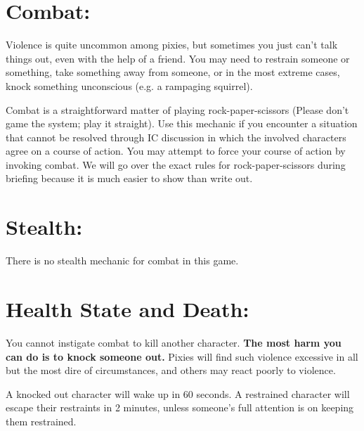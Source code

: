 \documentclass[sheet]{PP}
\begin{document}
\section*{Combat:}
Violence is quite uncommon among pixies, but sometimes you just can't talk things out, even with the help of a friend. You may need to restrain someone or something, take something away from someone, or in the most extreme cases, knock something unconscious (e.g. a rampaging squirrel).

Combat is a straightforward matter of playing rock-paper-scissors (Please don't game the system; play it straight). Use this mechanic if you encounter a situation that cannot be resolved through IC discussion in which the involved characters agree on a course of action. You may attempt to force your course of action by invoking combat. We will go over the exact rules for rock-paper-scissors during briefing because it is much easier to show than write out.

\section*{Stealth:} There is no stealth mechanic for combat in this game.

\section*{Health State and Death:} You cannot instigate combat to kill another character. \textbf{The most harm you can do is to knock someone out.} Pixies will find such violence excessive in all but the most dire of circumstances, and others may react poorly to violence.

A knocked out character will wake up in 60 seconds. A restrained character will escape their restraints in 2 minutes, unless someone's full attention is on keeping them restrained.
\end{document}

